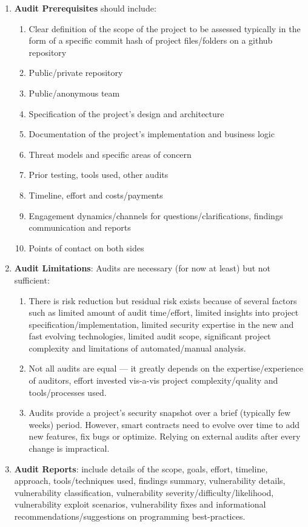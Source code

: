 \begin{enumerate}
\item\textbf{Audit Prerequisites} should include:
	\begin{enumerate}
	\item Clear definition of the scope of the project to be assessed typically in the form of a specific commit hash of project files/folders on a github repository
	\item Public/private repository
	\item Public/anonymous team
	\item Specification of the project’s design and architecture
	\item Documentation of the project’s implementation and business logic
	\item Threat models and specific areas of concern
	\item Prior testing, tools used, other audits
	\item Timeline, effort and costs/payments
	\item Engagement dynamics/channels for questions/clarifications, findings communication and reports
	\item Points of contact on both sides
	\end{enumerate}

\item\textbf{Audit Limitations}: Audits are necessary (for now at least) but not sufficient:
	\begin{enumerate}
	\item There is risk reduction but residual risk exists because of several factors such as limited amount of audit time/effort, limited insights into project specification/implementation, limited security expertise in the new and fast evolving technologies, limited audit scope, significant project complexity and limitations of automated/manual analysis.
	\item Not all audits are equal — it greatly depends on the expertise/experience of auditors, effort invested vis-a-vis project complexity/quality and tools/processes used.
	\item Audits provide a project’s security snapshot over a brief (typically few weeks) period. However, smart contracts need to evolve over time to add new features, fix bugs or optimize. Relying on external audits after every change is impractical.
	\end{enumerate}

\item\textbf{Audit Reports}: include details of the scope, goals, effort, timeline, approach, tools/techniques used, findings summary, vulnerability details, vulnerability classification, vulnerability severity/difficulty/likelihood, vulnerability exploit scenarios, vulnerability fixes and informational recommendations/suggestions on programming best-practices.


\end{enumerate}
